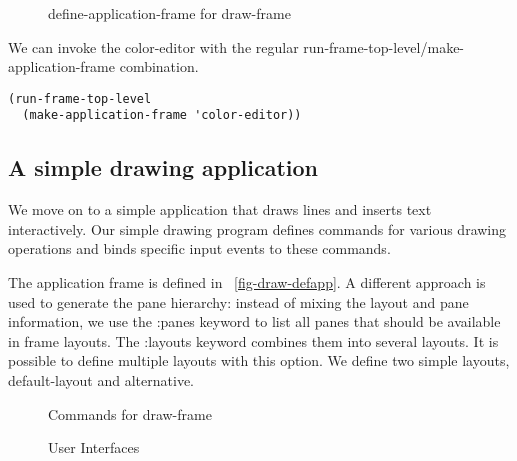 \documentclass[twocolumn,a4paper]{article}
\newcommand {\code}[1]{{\sffamily #1}}
\let\class\code
\let\method\code
\let\keyword\code
\begin{document}
\begin{figure*}[t] \lstset{style=framestyle}

\caption{define-application-frame for
\class{draw-frame}}\label{fig-draw-defapp}\label{fig-draw-handlerepaint}
\end{figure*}

We can invoke the color-editor with the regular
\method{run-frame-top-level}/\method{make-application-frame}
combination.  
\lstset{style=inlinestyle}
\begin{lstlisting}
(run-frame-top-level 
  (make-application-frame 'color-editor))
\end{lstlisting}


\subsection{A simple drawing application}

We move on to a simple application that draws
lines and inserts text interactively. Our simple drawing program
defines commands for various drawing operations and binds specific
input events to these commands.

The application frame is defined in
\figurename~\ref{fig-draw-defapp}. A different approach is used to
generate the pane hierarchy: instead of mixing the layout and pane
information, we use the \keyword{:panes} keyword to list all panes
that should be available in frame layouts. The \keyword{:layouts}
keyword combines them into several layouts. It is possible to define
multiple layouts with this option. We define two simple layouts,
\code{default-layout} and \code{alternative}.


\begin{figure*}[t]
\lstset{style=framestyle}

\caption{Commands for \class{draw-frame}}\label{fig-draw-commands}
\end{figure*}

\begin{figure*}
\lstset{style=framestyle}

\caption{User Interfaces}\label{fig-draw-interfacing}
\end{figure*}
\end{document}
